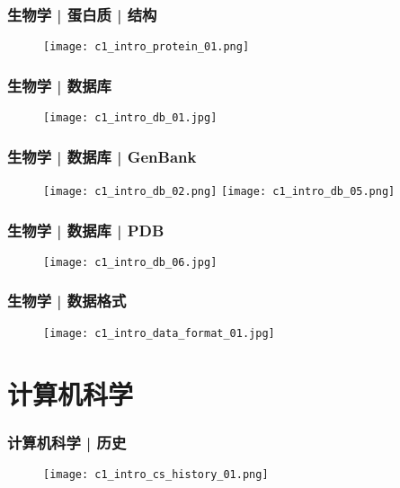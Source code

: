 \begin{frame}
  \frametitle{生物学 | 蛋白质 | 结构}
  \begin{figure}
    \centering
    \texttt{[image: c1\_intro\_protein\_01.png]}
  \end{figure}
\end{frame}

\begin{frame}
  \frametitle{生物学 | \alert{数据库}}
  \begin{figure}
    \centering
    \texttt{[image: c1\_intro\_db\_01.jpg]}
  \end{figure}
\end{frame}

\begin{frame}
  \frametitle{生物学 | 数据库 | GenBank}
  \begin{figure}
    \texttt{[image: c1\_intro\_db\_02.png]}
    \texttt{[image: c1\_intro\_db\_05.png]}
  \end{figure}
\end{frame}

\begin{frame}
  \frametitle{生物学 | 数据库 | PDB}
  \begin{figure}
    \centering
    \texttt{[image: c1\_intro\_db\_06.jpg]}
  \end{figure}
\end{frame}

\begin{frame}
  \frametitle{生物学 | 数据格式}
  \begin{figure}
    \centering
    \texttt{[image: c1\_intro\_data\_format\_01.jpg]}
  \end{figure}
\end{frame}

\section{计算机科学}
\begin{frame}
  \frametitle{计算机科学 | 历史}
  \begin{figure}
    \centering
    \texttt{[image: c1\_intro\_cs\_history\_01.png]}
  \end{figure}
\end{frame}

